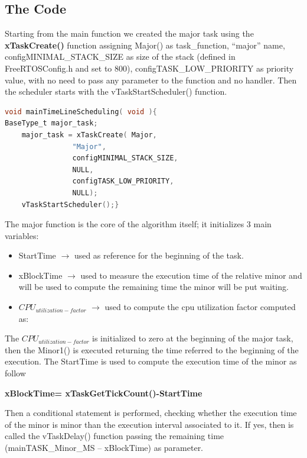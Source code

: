 \documentclass[9pt, reqno]{amsart}
\theoremstyle{definition}
\theoremstyle{remark}
\numberwithin{equation}{section}
\begin{document}
{\subsection{The Code}\newline
Starting from the main function we created the major task using the \textbf{xTaskCreate()} function assigning Major() as task\_function, “major” name, configMINIMAL\_STACK\_SIZE as size of the stack (defined in FreeRTOSConfig.h and set to 800), configTASK\_LOW\_PRIORITY as priority value, with no need to pass any parameter to the function and no handler.
Then the scheduler starts with the vTaskStartScheduler() function.
\begin{lstlisting}[breaklines=true, basicstyle=\bfseries,language=c,basicstyle=\small]
void mainTimeLineScheduling( void ){
BaseType_t major_task;
    major_task = xTaskCreate( Major,
                "Major",
                configMINIMAL_STACK_SIZE, 		 
                NULL,
                configTASK_LOW_PRIORITY,
                NULL);
    vTaskStartScheduler();}
\end{lstlisting}
The major function is the core of the algorithm itself; it initializes 3 main variables:
\begin{itemize}
    \item StartTime $\rightarrow$ used as reference for the beginning of the task.
    \item xBlockTime $\rightarrow$ used to measure the execution time of the relative minor and will be used to compute the remaining time the minor will be put waiting.
    \item 	$CPU_{utilization-factor}$ $\rightarrow$ used to compute the cpu utilization factor computed as:
\end{itemize}
The $CPU_{utilization-factor}$ is initialized to zero at the beginning of the major task, then the Minor1() is executed returning the time referred to the beginning of the execution.
The StartTime is used to compute the execution time of the minor as follow
\begin{center}
    \textbf{xBlockTime= xTaskGetTickCount()-StartTime}
\end{center}
Then a conditional statement is performed, checking whether the execution time of the minor is minor than the execution interval associated to it. If yes, then is called the vTaskDelay() function passing the remaining time (mainTASK\_Minor\_MS – xBlockTime) as parameter.
\begin{lstlisting}[breaklines=true, basicstyle=\bfseries,language=c,basicstyle=\small]

\end{lstlisting}}
\end{document}
